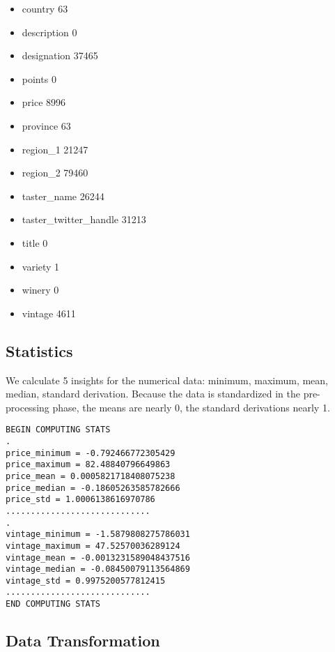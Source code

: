 \documentclass[11pt]{article}
\begin{document}
\begin{itemize}
    \item country                     63
    \item description                  0
    \item designation              37465
    \item points                       0
    \item price                     8996
    \item province                    63
    \item region\_1                 21247
    \item region\_2                 79460
    \item taster\_name              26244
    \item taster\_twitter\_handle    31213
    \item title                        0
    \item variety                      1
    \item winery                       0
    \item vintage                   4611
\end{itemize}

\subsection{Statistics}

We calculate 5 insights for the numerical data: minimum, maximum, mean, median, standard derivation. Because the data is standardized in the pre-processing phase, the means are nearly 0, the standard derivations nearly 1.

\begin{lstlisting}
BEGIN COMPUTING STATS
.
price_minimum = -0.792466772305429
price_maximum = 82.48840796649863
price_mean = 0.0005821718408075238
price_median = -0.18605263585782666
price_std = 1.0006138616970786
.............................
.
vintage_minimum = -1.5879808275786031
vintage_maximum = 47.52570036289124
vintage_mean = -0.0013231589048437516
vintage_median = -0.08450079113564869
vintage_std = 0.9975200577812415
.............................
END COMPUTING STATS
\end{lstlisting}

\subsection{Data Transformation}
\end{document}
